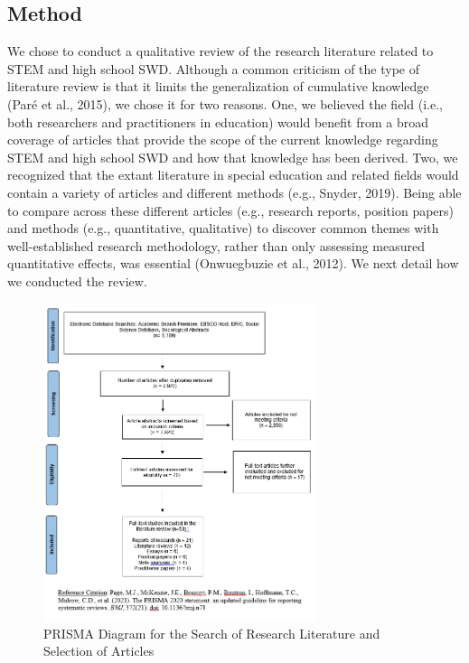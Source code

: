 \documentclass[11pt]{sig-alternate}
\begin{document}
\begin{large}
\section*{Method}
We chose to conduct a qualitative review of the research literature related to STEM and high school SWD. Although a common criticism of the type of literature review is that it limits the generalization of cumulative knowledge (Paré et al., 2015), we chose it for two reasons. One, we believed the field (i.e., both researchers and practitioners in education) would benefit from a broad coverage of articles that provide the scope of the current knowledge regarding STEM and high school SWD and how that knowledge has been derived. Two, we recognized that the extant literature in special education and related fields would contain a variety of articles and different methods (e.g., Snyder, 2019). Being able to compare across these different articles (e.g., research reports, position papers) and methods (e.g., quantitative, qualitative) to discover common themes with well-established research methodology, rather than only assessing measured quantitative effects, was essential (Onwuegbuzie et al., 2012). We next detail how we conducted the review. 

\begin{figure}[htp]
    \centering
    \includegraphics[width=8cm]{Figure 1.png}
 \caption{PRISMA Diagram for the Search of Research Literature and Selection of Articles }
    \label{PRISMA Diagram for the Search of Research Literature and Selection of Articles}
\end{figure}


\end{large}
\end{document}
